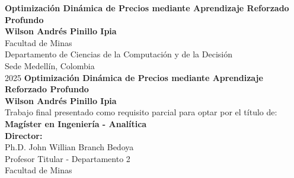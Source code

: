 \documentclass[10pt,spanish,fleqn,openany,twoside,letterpaper]{book}
\newcommand{\studentname}{}
\newcommand{\academictitle}{}
\newcommand{\thesisname}{}
\newcommand{\director}{}
\newcommand{\directortitle}{}
\newcommand{\issuedate}{}
\newcommand{\sede}{}
\newcommand{\department}{}
\newcommand{\departmenttwo}{} %
\newcommand{\faculty}{}
\renewcommand{\studentname}{Wilson Andrés Pinillo Ipia}
\renewcommand{\thesisname}{Optimización Dinámica de Precios mediante Aprendizaje Reforzado
Profundo}
\renewcommand{\issuedate}{2025}
\renewcommand{\director}{Ph.D. John Willian Branch Bedoya}
\renewcommand{\directortitle}{Profesor Titular}
\renewcommand{\academictitle}{Magíster en Ingeniería - Analítica}
\renewcommand{\sede}{Sede Medellín}
\renewcommand{\department}{Departamento de Ciencias de la Computación y de la Decisión}
\renewcommand{\departmenttwo}{Departamento 2} %
\renewcommand{\faculty}{Facultad de Minas}
\begin{document}
\renewcommand{\listfigurename}{\sffamily Lista de figuras}
\renewcommand{\listtablename}{\sffamily Lista de tablas}
\renewcommand{\contentsname}{\sffamily Contenido}
\renewcommand{\chaptername}{\sffamily Capítulo}
\renewcommand{\tablename}{\scriptsize \centering \textbf{Tabla}}
\renewcommand{\figurename}{\scriptsize \centering \textbf{Figura}}
\renewcommand{\appendixname}{\sffamily Anexo}

\renewcommand{\bibname}{\sffamily Referencias Bibliográficas}

{\newpage
\thispagestyle{empty}
\begin{center}
\begin{figure}
\centering
{}%
\end{figure}
\vspace{2.5cm}
\textbf{\Huge \thesisname} \\ 
\vspace{2.5cm}
\textbf{\Large \studentname} \\
\vspace{5.0cm}
\faculty \\ \department \\
\sede, Colombia \\
\issuedate
\newpage 
\thispagestyle{empty}
\vspace{2.0cm}
\textbf{\Huge \thesisname} \\
\vspace{2.0cm}
\textbf{\Large \studentname} \\
\vspace{2.0cm}
\small Trabajo final presentado como requisito parcial para optar por el título de: \\
{\bfseries \academictitle}\\
\vspace{2.0cm}
\textbf{Director:} \\
\director \\
\directortitle \; - \departmenttwo \\
\faculty \\

\end{center}}
\end{document}
